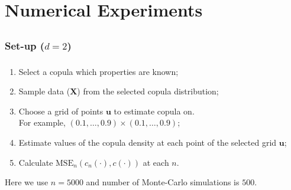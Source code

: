 \documentclass[aspectratio=169]{beamer}
\begin{document}
\section{Numerical Experiments}
	\subsection{}
		\subsubsection{Set-up ($ d=2 $)}
			\begin{frame}
				\frametitle{\insertsubsubsection}
				
				\begin{enumerate}
					\item Select a copula which properties are known;
					\item Sample data ($ \mathbf{X} $) from the selected copula distribution;
					\item Choose a grid of points $ \mathbf{u} $ to estimate copula on. \\For example, $ (0.1, \dots, 0.9)\times(0.1, \dots, 0.9) $;
					\item Estimate values of the copula density at each point of the selected grid $ \mathbf{u} $;
					\item Calculate $ \text{MSE}_n(c_n(\cdot), c(\cdot)) $ at each $ n $.\\[1em]
				\end{enumerate}
				
				Here we use $ n=5000 $ and number of Monte-Carlo simulations is $ 500 $.
			
			\end{frame}
			
\end{document}
